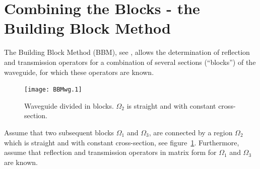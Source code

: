 \documentclass[numreferences]{kluwer}
\renewcommand{\Lambda}{\varLambda}
\renewcommand{\Lambda}{\varLambda}
\begin{document}


\section{Combining the Blocks - the Building Block Method}
\label{sec:comb-blocks-build}

The Building Block Method (BBM), see \cite{nilssonbrander1981b},
allows the determination of reflection and transmission operators for
a combination of several sections (``blocks'') of the waveguide, for
which these operators are known.  

\begin{figure}[htb]
  \centering
  \texttt{[image: BBMwg.1]}
  \caption{Waveguide divided in blocks. $\Omega_2$ is straight and
    with constant cross-section.}
  \label{fig:wg4}
\end{figure}


Assume that two subsequent blocks $\Omega_1$ and $\Omega_3$, are
connected by a region $\Omega_2$ which is straight and with constant
cross-section, see figure~\ref{fig:wg4}. 
Furthermore, assume that
reflection and transmission operators in matrix form for $\Omega_1$
and $\Omega_3$ are known. 
\end{document}
